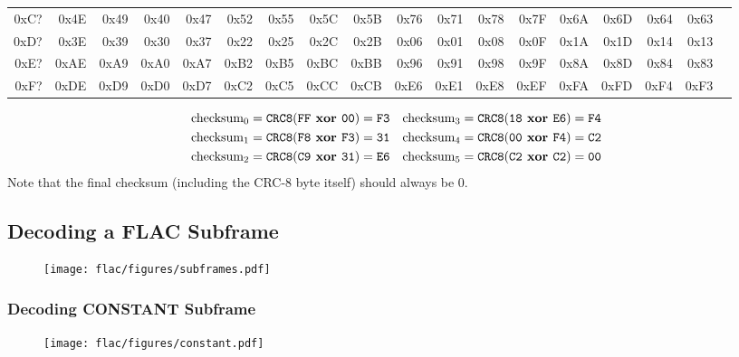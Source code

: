 \begin{table}[h]
{\begin{tabular}{|r||r|r|r|r|r|r|r|r|r|r|r|r|r|r|r|r|r|}
0xC? & 0x4E & 0x49 & 0x40 & 0x47 & 0x52 & 0x55 & 0x5C & 0x5B & 0x76 & 0x71 & 0x78 & 0x7F & 0x6A & 0x6D & 0x64 & 0x63 \\
0xD? & 0x3E & 0x39 & 0x30 & 0x37 & 0x22 & 0x25 & 0x2C & 0x2B & 0x06 & 0x01 & 0x08 & 0x0F & 0x1A & 0x1D & 0x14 & 0x13 \\
0xE? & 0xAE & 0xA9 & 0xA0 & 0xA7 & 0xB2 & 0xB5 & 0xBC & 0xBB & 0x96 & 0x91 & 0x98 & 0x9F & 0x8A & 0x8D & 0x84 & 0x83 \\
0xF? & 0xDE & 0xD9 & 0xD0 & 0xD7 & 0xC2 & 0xC5 & 0xCC & 0xCB & 0xE6 & 0xE1 & 0xE8 & 0xEF & 0xFA & 0xFD & 0xF4 & 0xF3 \\
\hline
\end{tabular}
}
\end{table}
{
\begin{align*}
\text{checksum}_0 = \texttt{CRC8}(\texttt{FF}\textbf{ xor }\texttt{00}) = \texttt{F3} & &
\text{checksum}_3 = \texttt{CRC8}(\texttt{18}\textbf{ xor }\texttt{E6}) = \texttt{F4} \\
\text{checksum}_1 = \texttt{CRC8}(\texttt{F8}\textbf{ xor }\texttt{F3}) = \texttt{31} & &
\text{checksum}_4 = \texttt{CRC8}(\texttt{00}\textbf{ xor }\texttt{F4}) = \texttt{C2} \\
\text{checksum}_2 = \texttt{CRC8}(\texttt{C9}\textbf{ xor }\texttt{31}) = \texttt{E6} & &
\text{checksum}_5 = \texttt{CRC8}(\texttt{C2}\textbf{ xor }\texttt{C2}) = \texttt{00} \\
\end{align*}
Note that the final checksum (including the CRC-8 byte itself)
should always be 0.
}

\clearpage

\subsection{Decoding a FLAC Subframe}
\label{flac:decode_subframe}
{
  
}
\begin{figure}[h]
\texttt{[image: flac/figures/subframes.pdf]}
\end{figure}

\clearpage

\subsubsection{Decoding CONSTANT Subframe}
\label{flac:decode_constant}

\begin{figure}[h]
  \texttt{[image: flac/figures/constant.pdf]}
\end{figure}

